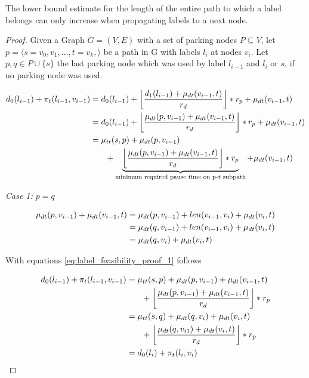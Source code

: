 The lower bound estimate for the length of the entire path to which a label belongs can only increase when propagating labels to a next node.

\begin{proof}
	Given a Graph $G=(V,E)$ with a set of parking nodes $P \subseteq V$, let $p = \langle s=v_0,v_1,\ldots,t=v_k, \rangle$ be a path in G with labels $l_i$ at nodes $v_i$. Let $p,q \in P \cup \{s\}$ the last parking node which was used by label $l_{i-1}$ and $l_{i}$ or $s$, if no parking node was used.

	\begin{align}
		\begin{split}\label{eq:label_feasibility_proof_1}
			d_0(l_{i-1}) + \pi_t(l_{i-1},v_{i-1}) &= d_0(l_{i-1})+\floor*{ \frac{d_1(l_{i-1}) + \drivingtime(v_{i-1},t)}{\restr_d} } * \restr_p + \drivingtime(v_{i-1},t)\\
			&= d_0(l_{i-1})+ \floor*{ \frac{\drivingtime(p,v_{i-1}) + \drivingtime(v_{i-1},t)}{\restr_d} } * \restr_p + \drivingtime(v_{i-1},t)\\
			&=\traveltime(s,p) + \drivingtime(p,v_{i-1})\\
			& \phantom{{}=1} + \underbrace{\floor*{ \frac{\drivingtime(p,v_{i-1}) + \drivingtime(v_{i-1},t)}{\restr_d} } * \restr_p}_\text{minimum required pause time on p-t subpath} + \drivingtime(v_{i-1},t)
		\end{split}
	\end{align}

	\emph{Case 1: $p=q$}

	\begin{align}
		\begin{split}\label{eq:label_feasibility_proof_2}
			\mu_{dt}(p,v_{i-1}) + \mu_{dt}(v_{i-1},t) & = \mu_{dt}(p,v_{i-1}) + len(v_{i-1},v_i) + \mu_{dt}(v_i,t) \\
			& = \mu_{dt}(q,v_{i-1}) + len(v_{i-1},v_i) + \mu_{dt}(v_i,t) \\
			& = \mu_{dt}(q,v_i) + \mu_{dt}(v_i,t)
		\end{split}
	\end{align}

	With equations \ref{eq:label_feasibility_proof_1} follows

	\begin{align}
		\begin{split}\label{eq:label_feasibility_proof_3}
			d_0(l_{i-1}) + \pi_t(l_{i-1},v_{i-1}) &= \traveltime(s,p) + \drivingtime(p,v_{i-1}) + \drivingtime(v_{i-1},t)\\
			& \phantom{{}=1} + \floor*{ \frac{\drivingtime(p,v_{i-1}) + \drivingtime(v_{i-1},t)}{\restr_d} } * \restr_p\\
			&= \traveltime(s,q) + \drivingtime(q,v_{i}) + \drivingtime(v_{i},t)\\
			& \phantom{{}=1} + \floor*{ \frac{\drivingtime(q,v_{i1}) + \drivingtime(v_{i},t)}{\restr_d} } * \restr_p\\
			&= d_0(l_{i}) + \pi_t(l_{i},v_{i})
		\end{split}
	\end{align}


\end{proof}
